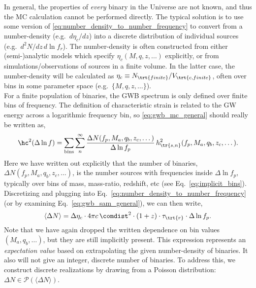 \documentclass[10pt, oneside, onecolumn]{article}   	%
\newcommand{\hsn}{h_\tr{s,n}}
\newcommand{\poisson}{\mathcal{P}}
\newcommand{\thard}{\tau_\trt{r}}
\newcommand{\ndens}{\eta_c}
\begin{document}
                In general, the properties of \textit{every} binary in the Universe are not known, and thus the MC calculation cannot be performed directly.  The typical solution is to use some version of \eqref{eq:number_density_to_number_frequency} to convert from a number-density (e.g.~$d\ndens/dz$) into a discrete distribution of individual sources (e.g.~$d^2 N / dz \, d\ln f_r$).  The number-density is often constructed from either (semi-)analytic models which specify $\ndens(M,q,z,\dots)$ explicitly, or from simulations/observations of sources in a finite volume.  In the latter case, the number-density will be calculated as $\ndens \equiv N_\trt{finite}/V_\trt{c,finite}$, often over bins in some parameter space (e.g.~$\{M, q, z, \dots\}$). \\

                For a finite population of binaries, the GWB spectrum is only defined over finite bins of frequency.  The definition of characteristic strain is related to the GW energy across a logarithmic frequency bin, so \eqref{eq:gwb_mc_general} should really be written as,
                \begin{equation}
                    \label{eq:gwb_discrete}
                    \hc^2(\Delta \ln f) = \sum_\textrm{bins} \sum_n^\infty \frac{\Delta N(f_p,M_a,q_b,z_c,\dots)}{\Delta \ln f_p} \, \hsn^2(f_p,M_a,q_b,z_c,\dots).
                \end{equation}
                Here we have written out explicitly that the number of binaries, $\Delta N(f_p,M_a,q_b,z_c,\dots)$, is the number sources with frequencies inside $\Delta \ln f_p$, typically over bins of mass, mass-ratio, redshift, etc (see Eq.~\ref{eq:implicit_bins}).  Discretizing and plugging into Eq.~\ref{eq:number_density_to_number_frequency} (or by examining Eq.~\ref{eq:gwb_sam_general}), we can then write,
                \begin{equation}
                    \label{eq:expectation_number_of_binaries}
                    \langle \Delta N \rangle = \Delta \ndens \cdot 4\pi c \, \comdist^2 \cdot (1+z) \cdot \thard \cdot \Delta \ln f_p.
                \end{equation}
                Note that we have again dropped the written dependence on bin values $(M_a, q_b, \dots)$, but they are still implicitly present.  This expression represents an \textit{expectation value} based on extrapolating the given number-density of binaries.  It also will not give an integer, discrete number of binaries.  To address this, we construct discrete realizations by drawing from a Poisson distribution: $\Delta N \in \poisson(\langle \Delta N \rangle)$. \\
\end{document}
